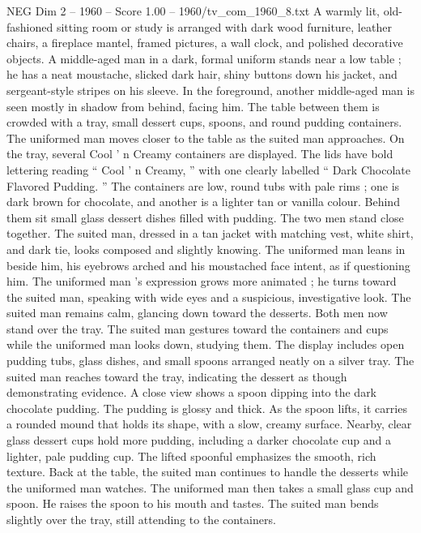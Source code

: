 \begin{textsample}{NEG Dim 2 – 1960 – Score 1.00 – 1960/tv\_com\_1960\_8.txt}  \label{ex:f2_neg_087}
A warmly lit, old-fashioned sitting room or study is arranged with dark wood furniture, leather chairs, a fireplace mantel, framed pictures, a wall clock, and polished decorative objects.
A middle-aged man in a dark, formal uniform stands near a low table ; he has a neat moustache, slicked dark hair, shiny buttons down his jacket, and sergeant-style stripes on his sleeve.
In the foreground, another middle-aged man is seen mostly in shadow from behind, facing him.
The table between them is crowded with a tray, small dessert cups, spoons, and round pudding containers.
The uniformed man moves closer to the table as the suited man approaches.
On the tray, several Cool ’ n Creamy containers are displayed.
The lids have bold lettering reading “ Cool ’ n Creamy, ” with one clearly labelled “ Dark Chocolate Flavored Pudding. ” The containers are low, round tubs with pale rims ; one is dark brown for chocolate, and another is a lighter tan or vanilla colour.
Behind them sit small glass dessert dishes filled with pudding.
The two men stand close together.
The suited man, dressed in a tan jacket with matching vest, white shirt, and dark tie, looks composed and slightly knowing.
The uniformed man leans in beside him, his eyebrows arched and his moustached face intent, as if questioning him.
The uniformed man ’s expression grows more animated ; he turns toward the suited man, speaking with wide eyes and a suspicious, investigative look.
The suited man remains calm, glancing down toward the desserts.
Both men now stand over the tray.
The suited man gestures toward the containers and cups while the uniformed man looks down, studying them.
The display includes open pudding tubs, glass dishes, and small spoons arranged neatly on a silver tray.
The suited man reaches toward the tray, indicating the dessert as though demonstrating evidence.
A close view shows a spoon dipping into the dark chocolate pudding.
The pudding is glossy and thick.
As the spoon lifts, it carries a rounded mound that holds its shape, with a slow, creamy surface.
Nearby, clear glass dessert cups hold more pudding, including a darker chocolate cup and a lighter, pale pudding cup.
The lifted spoonful emphasizes the smooth, rich texture.
Back at the table, the suited man continues to handle the desserts while the uniformed man watches.
The uniformed man then takes a small glass cup and spoon.
He raises the spoon to his mouth and tastes.
The suited man bends slightly over the tray, still attending to the containers.

\end{textsample}
